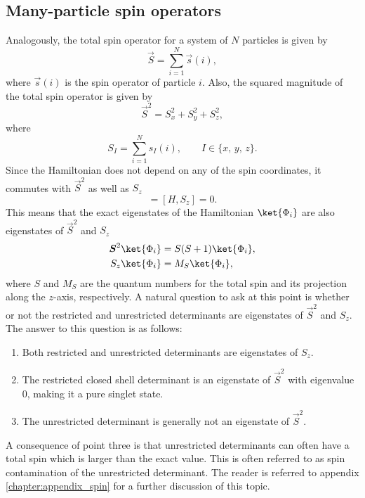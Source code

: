 \subsection{Many-particle spin operators}
Analogously, the total spin operator for a system of $N$ particles is given by
\begin{equation}
 \vec S = \sum_{i=1}^N \vec s(i),
\end{equation}
where $\vec s(i)$ is the spin operator of particle $i$. Also, the squared magnitude of the total spin operator is given by
\begin{equation}
 \vec S^2 = S_x^2 + S_y^2 + S_z^2,
\end{equation}
where
\begin{equation}
 S_I = \sum_{i=1}^N s_I(i), \qquad I\in\{x,\,y,\,z\}.
\end{equation}
Since the Hamiltonian does not depend on any of the spin coordinates, it commutes with $\vec S^2$ as well as $S_z$
\begin{equation}
 [H,\,\vec S^2] = [H, S_z] = 0.
\end{equation}
This means that the exact eigenstates of the Hamiltonian $\ket{\Phi_i}$ are also eigenstates of $\vec S^2$ and $S_z$ \cite{Szabo}
\begin{align}
 \vec S^2\ket{\Phi_i} & = S(S+1)\ket{\Phi_i},\\
 S_z\ket{\Phi_i} & = M_S\ket{\Phi_i},
\end{align}
where $S$ and $M_S$ are the quantum numbers for the total spin and its projection along the $z$-axis, respectively. A natural question
to ask at this point is whether or not the restricted and unrestricted determinants are eigenstates of $\vec S^2$ and $S_z$. The answer to this question is as follows:
\begin{enumerate}
 \item Both restricted and unrestricted determinants are eigenstates of $S_z$.
 \item The restricted closed shell determinant is an eigenstate of $\vec S^2$ with eigenvalue 0, making it a pure singlet state.
 \item The unrestricted determinant is generally not an eigenstate of $\vec S^2$.
\end{enumerate}
A consequence of point three is that unrestricted determinants can often have a total spin which is larger than the exact value. This is often referred
to as spin contamination of the unrestricted determinant. The reader is referred to appendix \ref{chapter:appendix_spin} for a further discussion of this topic.




